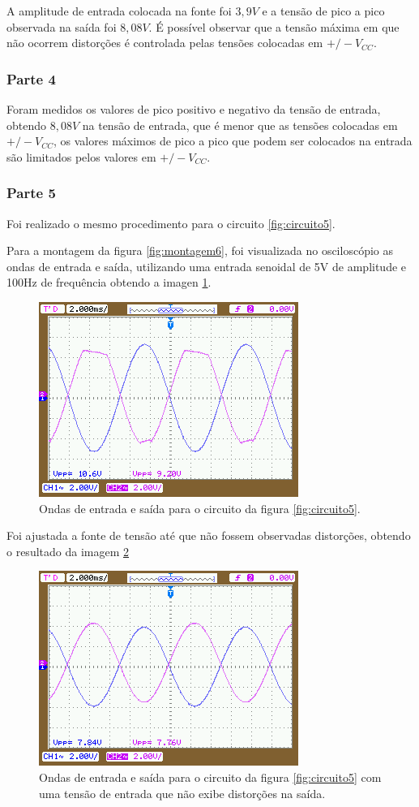\documentclass{abntex2}
\begin{document}
A amplitude de entrada colocada na fonte foi $3,9V$ e a tensão de pico a pico observada na saída foi $8,08V$. É possível observar que a tensão máxima em que não ocorrem distorções é controlada pelas tensões colocadas em $+/-V_{CC}$.

\subsubsection{Parte 4}
Foram medidos os valores de pico positivo e negativo da tensão de entrada, obtendo $8,08V$ na tensão de entrada, que é menor que as tensões colocadas em $+/-V_{CC}$, os valores máximos de pico a pico que podem ser colocados na entrada são limitados pelos valores em $+/-V_{CC}$.

\subsubsection{Parte 5}
Foi realizado o mesmo procedimento para o circuito \ref{fig:circuito5}.

Para a montagem da figura \ref{fig:montagem6}, foi visualizada no osciloscópio as ondas de entrada e saída, utilizando uma entrada senoidal de 5V de amplitude e 100Hz de frequência obtendo a imagen \ref{fig:inout5}.
\begin{figure}[h]
  \centering
  \includegraphics[scale = 0.5]{NewFile5.png}
  \caption{Ondas de entrada e saída para o circuito da figura \ref{fig:circuito5}.}
  \label{fig:inout5}
\end{figure}

Foi ajustada a fonte de tensão até que não fossem observadas distorções, obtendo o resultado da imagem \ref{fig:inout6}
\begin{figure}[h]
  \centering
  \includegraphics[scale = 0.5]{NewFile6.png}
  \caption{Ondas de entrada e saída para o circuito da figura \ref{fig:circuito5} com uma tensão de entrada que não exibe distorções na saída.}
  \label{fig:inout6}
\end{figure}
\end{document}
